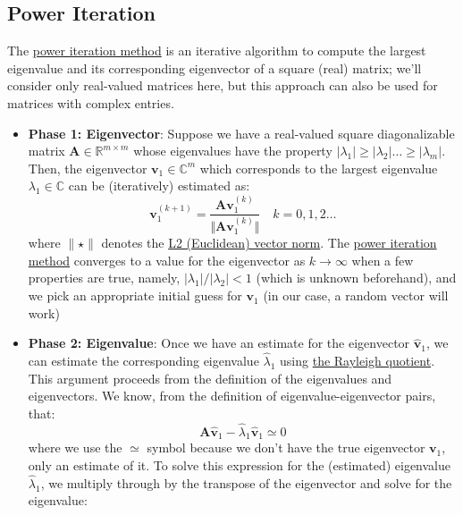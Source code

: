 \documentclass{article}[11pt]
\begin{document}
\subsection{Power Iteration}
The \href{https://en.wikipedia.org/wiki/Power_iteration}{power iteration method} 
is an iterative algorithm to compute the largest eigenvalue and its corresponding eigenvector of a square (real) matrix; we'll consider only real-valued matrices here, 
but this approach can also be used for matrices with complex entries. 

\begin{mdframed}
\begin{itemize}[leftmargin=16pt]
\item{\textbf{Phase 1: Eigenvector}: Suppose we have a real-valued square diagonalizable matrix $\mathbf{A}\in\mathbb{R}^{m\times{m}}$ whose eigenvalues have the property $|\lambda_{1}|\geq|\lambda_{2}|\dots\geq|\lambda_{m}|$. 
   Then, the eigenvector $\mathbf{v}_{1}\in\mathbb{C}^{m}$ which corresponds to the largest eigenvalue $\lambda_{1}\in\mathbb{C}$ can be (iteratively) estimated as:
   \begin{equation}
      \mathbf{v}_{1}^{(k+1)} = \frac{\mathbf{A}\mathbf{v}_{1}^{(k)}}{\Vert \mathbf{A}\mathbf{v}_{1}^{(k)} \Vert}\quad{k=0,1,2\dots}
   \end{equation}
   where $\lVert \star \rVert$ denotes the \href{https://mathworld.wolfram.com/L2-Norm.html}{L2 (Euclidean) vector norm}. 
   The \href{https://en.wikipedia.org/wiki/Power_iteration}{power iteration method} converges to a value for the eigenvector as $k\rightarrow\infty$ 
   when a few properties are true, namely, $|\lambda_{1}|/|\lambda_{2}| < 1$ (which is unknown beforehand), and we pick an appropriate initial guess for $\mathbf{v}_{1}$ (in our case, a random vector will work)
}
\item{\textbf{Phase 2: Eigenvalue}: Once we have an estimate for the eigenvector $\hat{\mathbf{v}}_{1}$, we can estimate the corresponding eigenvalue $\hat{\lambda}_{1}$ using \href{https://en.wikipedia.org/wiki/Rayleigh_quotient}{the Rayleigh quotient}. 
   This argument proceeds from the definition of the eigenvalues and eigenvectors. We know, from the definition of eigenvalue-eigenvector pairs, that:
   \begin{equation}
      \mathbf{A}\hat{\mathbf{v}}_{1} - \hat{\lambda}_{1}\hat{\mathbf{v}}_{1}\simeq{0}
   \end{equation}
where we use the $\simeq$ symbol because we don't have the true eigenvector $\mathbf{v}_{1}$, only an estimate of it. To solve this expression for the (estimated) eigenvalue $\hat{\lambda}_{1}$, we multiply through by the transpose of the eigenvector and solve for the eigenvalue:
}
\end{itemize}
\end{mdframed}
\end{document}
